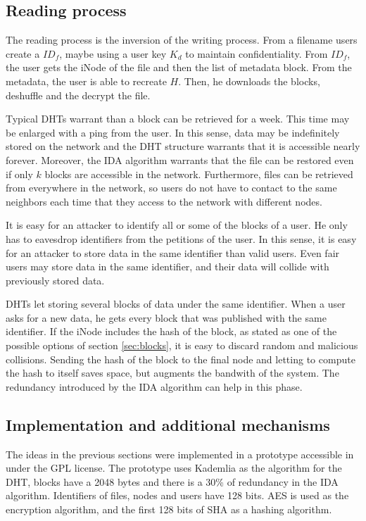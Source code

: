 \documentclass{llncs}
\begin{document}
\subsection{Reading process}

The reading process is the inversion of the writing process. From a filename users create a $ID_f$,
maybe using a user key $K_d$ to maintain confidentiality. From $ID_f$, the user gets the iNode of the
file and then the list of metadata block. From the metadata, the user is able to recreate $H$. Then, he downloads the blocks, deshuffle and the decrypt the file.

Typical DHTs warrant than a block can be retrieved for a week. This time may be enlarged with a ping from the
user. In this sense, data may be indefinitely stored on the network and the DHT structure warrants that it is
accessible nearly forever. Moreover, the IDA algorithm warrants that the file can be restored even if only $k$ blocks are accessible in the network. Furthermore, files can be retrieved from everywhere in the network, so users do not have to contact to the same neighbors each time that they access to the network with different nodes.

It is easy for an attacker to identify all or some of the blocks of a user. He only has to eavesdrop identifiers from the petitions of the user. In this sense, it is easy for an attacker to store data in the same identifier than valid users. Even fair users may store data in the same identifier, and their data will collide with previously stored data.

DHTs let storing several blocks of data under the same identifier. When a user asks for a new data, he gets every block that was published with the same identifier. If the iNode includes the hash of the block, as stated as one of the possible options of section \ref{sec:blocks}, it is easy to discard random and malicious collisions. Sending the hash of the block to the final node and letting to compute the hash to itself saves space, but augments the bandwith of the system. The redundancy introduced by the IDA algorithm can help in this phase.

\subsection{Implementation and additional mechanisms}

The ideas in the previous sections were implemented in a prototype accessible in~\cite{SCFS} under the GPL license. The prototype uses Kademlia as the algorithm for the DHT, blocks have a 2048 bytes and there is a 30\% of redundancy in the IDA algorithm. Identifiers of files, nodes and users have 128 bits. AES is used as the encryption algorithm, and the first 128 bits of SHA as a hashing algorithm.
\end{document}
